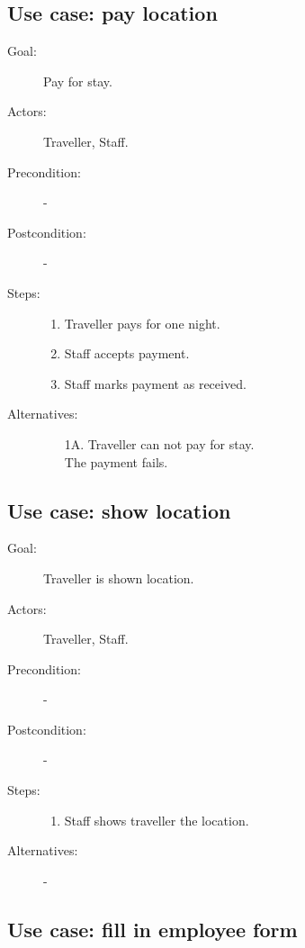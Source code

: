 \subsection{Use case: pay location}

\begin{description}
\item[Goal:] Pay for stay.
\item[Actors:] Traveller, Staff.
\item[Precondition:] -
\item[Postcondition:] -
\item[Steps:] 
\begin{enumerate}
\item Traveller pays for one night.
\item Staff accepts payment.
\item Staff marks payment as received.
\end{enumerate}

\item[Alternatives:]
\begin{enumerate}
\item[1A.] Traveller can not pay for stay.\\
The payment fails.
\end{enumerate}
\end{description}

\subsection{Use case: show location}

\begin{description}
\item[Goal:] Traveller is shown location.
\item[Actors:] Traveller, Staff.
\item[Precondition:] -
\item[Postcondition:] -
\item[Steps:] 
\begin{enumerate}
\item Staff shows traveller the location.
\end{enumerate}

\item[Alternatives:] -
\end{description}

\subsection{Use case: fill in employee form}


